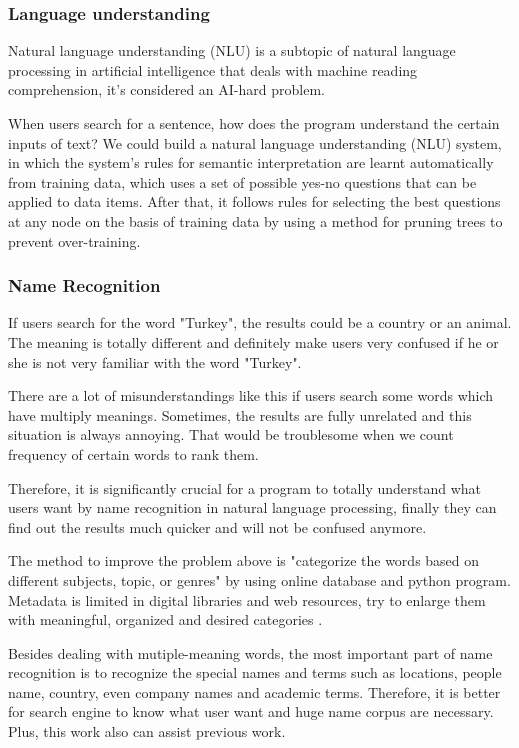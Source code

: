 \subsubsection*{Language understanding}

Natural language understanding (NLU) is a subtopic of natural language processing in artificial intelligence that deals with machine reading comprehension, it's considered an AI-hard problem.

When users search for a sentence, how does the program understand the certain inputs of text? We could build a natural language understanding (NLU) system, in which the system's rules for semantic interpretation are learnt automatically from training data, which uses a set of possible yes-no questions that can be applied to data items.
After that, it follows rules for selecting the best questions at any node on the basis of training data by using a method for pruning trees to prevent over-training.

\subsubsection*{Name Recognition}

If users search for the word "Turkey", the results could be a country or an animal. The meaning is totally different and definitely make users very confused if he or she is not very familiar with the word "Turkey". 

There are a lot of misunderstandings like this if users search some words which have multiply meanings. Sometimes, the results are fully unrelated and this situation is always annoying. That would be troublesome when we count frequency of certain words to rank them.

Therefore, it is significantly crucial for a program to totally understand what users want by name recognition in natural language processing, finally they can find out the results much quicker and will not be confused anymore.

The method to improve the problem above is "categorize the words based on different subjects, topic, or genres" by using online database and python program. Metadata is limited in digital libraries and web resources, try to enlarge them with meaningful, organized and desired
categories \cite{Kules2006}.

Besides dealing with mutiple-meaning words, the most important part of name recognition is to recognize the special names and terms such as locations, people name, country, even company names and academic terms.
Therefore, it is better for search engine to know what user want and huge name corpus are necessary. Plus, this work also can assist previous work.

